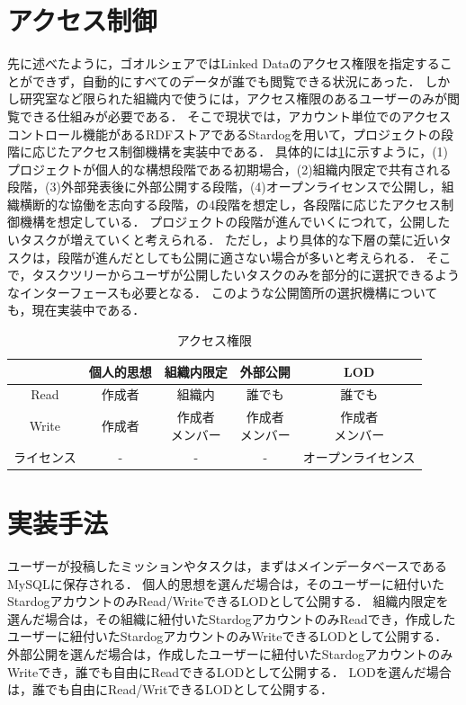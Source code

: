 \section{アクセス制御}
先に述べたように，ゴオルシェアではLinked Dataのアクセス権限を指定することができず，自動的にすべてのデータが誰でも閲覧できる状況にあった．
しかし研究室など限られた組織内で使うには，アクセス権限のあるユーザーのみが閲覧できる仕組みが必要である．
そこで現状では，アカウント単位でのアクセスコントロール機能があるRDFストアであるStardogを用いて，プロジェクトの段階に応じたアクセス制御機構を実装中である．
具体的には\ref{table:permission_table}に示すように，(1)プロジェクトが個人的な構想段階である初期場合，(2)組織内限定で共有される段階，(3)外部発表後に外部公開する段階，(4)オープンライセンスで公開し，組織横断的な協働を志向する段階，の4段階を想定し，各段階に応じたアクセス制御機構を想定している．
プロジェクトの段階が進んでいくにつれて，公開したいタスクが増えていくと考えられる．
ただし，より具体的な下層の葉に近いタスクは，段階が進んだとしても公開に適さない場合が多いと考えられる．
そこで，タスクツリーからユーザが公開したいタスクのみを部分的に選択できるようなインターフェースも必要となる．
このような公開箇所の選択機構についても，現在実装中である．

\begin{table}[t]
 \caption{アクセス権限}
 \begin{center}
	 \begin{tabular}{ | c || c | c | c | c | } \hline
		  & 個人的思想 & 組織内限定 & 外部公開 & LOD \\ \hline \hline
			Read & 作成者 & 組織内 & 誰でも & 誰でも \\ \hline
			Write & 作成者 & \shortstack{ 作成者 \\ メンバー } & \shortstack{ 作成者 \\ メンバー } & \shortstack{ 作成者 \\ メンバー } \\ \hline
			ライセンス & - & - & - & オープンライセンス \\ \hline
	 \end{tabular}
	 \label{table:permission_table}
 \end{center}
\end{table}

\section{実装手法}
ユーザーが投稿したミッションやタスクは，まずはメインデータベースであるMySQLに保存される．
個人的思想を選んだ場合は，そのユーザーに紐付いたStardogアカウントのみRead/WriteできるLODとして公開する．
組織内限定を選んだ場合は，その組織に紐付いたStardogアカウントのみReadでき，作成したユーザーに紐付いたStardogアカウントのみWriteできるLODとして公開する．
外部公開を選んだ場合は，作成したユーザーに紐付いたStardogアカウントのみWriteでき，誰でも自由にReadできるLODとして公開する．
LODを選んだ場合は，誰でも自由にRead/WritできるLODとして公開する．

